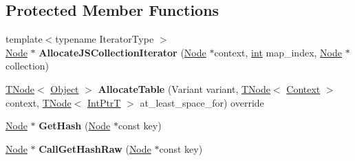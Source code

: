 \subsection*{Protected Member Functions}
\begin{DoxyCompactItemize}
\item 
\mbox{\label{classv8_1_1internal_1_1CollectionsBuiltinsAssembler_a141a25f2633b328c374b7cb65124b76a}} 
{\footnotesize template$<$typename Iterator\+Type $>$ }\\\mbox{\hyperlink{classv8_1_1internal_1_1compiler_1_1Node}{Node}} $\ast$ {\bfseries Allocate\+J\+S\+Collection\+Iterator} (\mbox{\hyperlink{classv8_1_1internal_1_1compiler_1_1Node}{Node}} $\ast$context, \mbox{\hyperlink{classint}{int}} map\+\_\+index, \mbox{\hyperlink{classv8_1_1internal_1_1compiler_1_1Node}{Node}} $\ast$collection)
\item 
\mbox{\label{classv8_1_1internal_1_1CollectionsBuiltinsAssembler_a516531b36ef52ebaf7a082f7f249ef8a}} 
\mbox{\hyperlink{classv8_1_1internal_1_1compiler_1_1TNode}{T\+Node}}$<$ \mbox{\hyperlink{classv8_1_1internal_1_1Object}{Object}} $>$ {\bfseries Allocate\+Table} (Variant variant, \mbox{\hyperlink{classv8_1_1internal_1_1compiler_1_1TNode}{T\+Node}}$<$ \mbox{\hyperlink{classv8_1_1internal_1_1Context}{Context}} $>$ context, \mbox{\hyperlink{classv8_1_1internal_1_1compiler_1_1TNode}{T\+Node}}$<$ \mbox{\hyperlink{structv8_1_1internal_1_1IntPtrT}{Int\+PtrT}} $>$ at\+\_\+least\+\_\+space\+\_\+for) override
\item 
\mbox{\label{classv8_1_1internal_1_1CollectionsBuiltinsAssembler_a55029fbec0a6161bd5900b8978b5b662}} 
\mbox{\hyperlink{classv8_1_1internal_1_1compiler_1_1Node}{Node}} $\ast$ {\bfseries Get\+Hash} (\mbox{\hyperlink{classv8_1_1internal_1_1compiler_1_1Node}{Node}} $\ast$const key)
\item 
\mbox{\label{classv8_1_1internal_1_1CollectionsBuiltinsAssembler_a0e6746aa87b40557289e8873703659b9}} 
\mbox{\hyperlink{classv8_1_1internal_1_1compiler_1_1Node}{Node}} $\ast$ {\bfseries Call\+Get\+Hash\+Raw} (\mbox{\hyperlink{classv8_1_1internal_1_1compiler_1_1Node}{Node}} $\ast$const key)
\item 

\end{DoxyCompactItemize}

